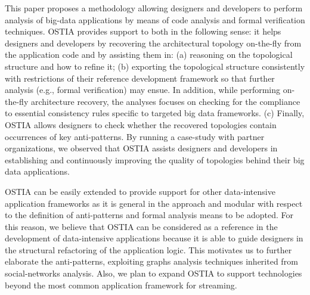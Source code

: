 
This paper proposes a methodology allowing designers and developers to perform analysis of big-data applications by means of code analysis and formal verification techniques.
OSTIA provides support to both in the following sense:
it helps designers and developers by recovering the architectural topology on-the-fly from the application code and by assisting them in: 
(a) reasoning on the topological structure and how to refine it; 
(b) exporting the topological structure consistently with restrictions of their reference development framework so that further analysis (e.g., formal verification) may ensue. In addition, while performing on-the-fly architecture recovery, the analyses focuses on checking for the compliance to essential consistency rules specific to targeted big data frameworks. 
(c) Finally, OSTIA allows designers to check whether the recovered topologies contain occurrences of key anti-patterns. By running a case-study with partner organizations, we observed that OSTIA assists designers and developers in establishing and continuously improving the quality of topologies behind their big data applications. 

OSTIA can be easily extended to provide support for other data-intensive application frameworks as it is general in the approach and modular with respect to the definition of anti-patterns and formal analysis means to be adopted.
For this reason, we believe that OSTIA can be considered as a reference in the development of data-intensive applications because it is able to guide designers in the structural refactoring of the application logic.
This motivates us to further elaborate the anti-patterns, 
exploiting graphs analysis techniques inherited from social-networks analysis. Also, we plan to expand OSTIA to support technologies beyond the most common application framework for streaming. %


